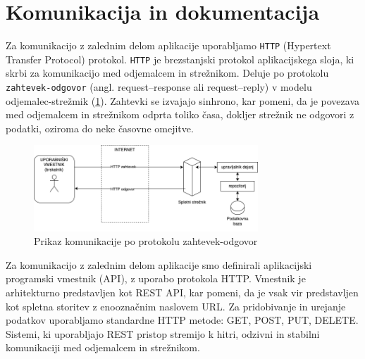 \documentclass[a4paper, 12pt]{book}
\begin{document}
\section{Komunikacija in dokumentacija}
Za komunikacijo z zalednim delom aplikacije uporabljamo \verb=HTTP= (Hypertext Transfer Protocol) protokol. \verb=HTTP= je brezstanjski protokol aplikacijskega sloja, ki skrbi za komunikacijo med odjemalcem in strežnikom. Deluje po protokolu \verb=zahtevek-odgovor= (angl. request–response ali request–reply) v modelu odjemalec-strežmik (\ref{communication-flow}). Zahtevki se izvajajo sinhrono, kar pomeni, da je povezava med odjemalcem in strežnikom odprta toliko časa, dokljer strežnik ne odgovori z podatki, oziroma do neke časovne omejitve. \cite{http-rfc}


\begin{figure}[h]
\begin{center}
\includegraphics[width=0.75\textwidth]{slike/communication.png}
\end{center}
\caption{ Prikaz komunikacije po protokolu zahtevek-odgovor }
\label{communication-flow}
\end{figure}

Za komunikacijo z zalednim delom aplikacije smo definirali aplikacijski programski vmestnik (API), z uporabo protokola HTTP. Vmestnik je arhitekturno predstavljen kot REST API, kar pomeni, da je vsak vir predstavljen kot spletna storitev z enooznačnim naslovem URL. Za pridobivanje in urejanje podatkov uporabljamo standardne HTTP metode: GET, POST, PUT, DELETE. Sistemi, ki uporabljajo REST pristop stremijo k hitri, odzivni in stabilni komunikaciji med odjemalcem in strežnikom.
\end{document}
